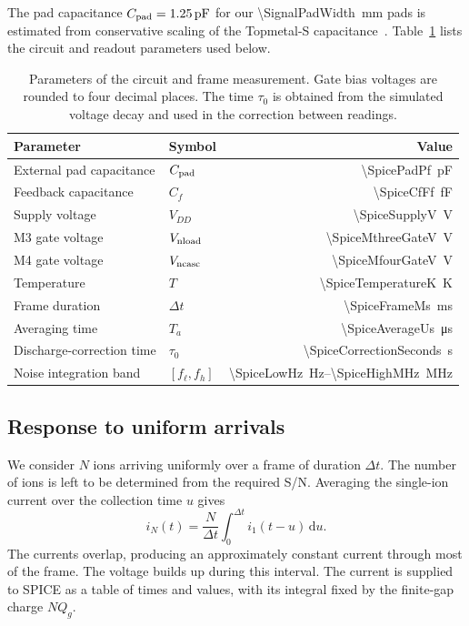 \documentclass[11pt,a4paper]{article}
\newcommand{\dd}{\mathrm{d}}
\begin{document}
The pad capacitance $C_{\rm pad}=\SI{1.25}{pF}$ for
our \SI{\SignalPadWidth}{mm} pads is estimated from conservative scaling
of the Topmetal-S capacitance~\cite{Gao2019TopmetalS}.
Table~\ref{tab:spice_parameters} lists the circuit and
readout parameters used below.

\begin{table}[!htbp]
 \centering
 \begin{tabular}{llr}
 \toprule
 Parameter & Symbol & Value \\
 \midrule
 External pad capacitance & $C_{\rm pad}$ & \SI{\SpicePadPf}{pF} \\
 Feedback capacitance & $C_f$ & \SI{\SpiceCfFf}{fF} \\
 Supply voltage & $V_{DD}$ & \SI{\SpiceSupplyV}{V} \\
 M3 gate voltage & $V_{\rm nload}$ & \SI{\SpiceMthreeGateV}{V} \\
 M4 gate voltage & $V_{\rm ncasc}$ & \SI{\SpiceMfourGateV}{V} \\
 Temperature & $T$ & \SI{\SpiceTemperatureK}{K} \\
 \midrule
 Frame duration & $\Delta t$ & \SI{\SpiceFrameMs}{ms} \\
 Averaging time & $T_a$ & \SI{\SpiceAverageUs}{\micro\second} \\
 Discharge-correction time & $\tau_0$ & \SI{\SpiceCorrectionSeconds}{s} \\
 Noise integration band & $[f_\ell,f_h]$ &
 \SI{\SpiceLowHz}{Hz}--\SI{\SpiceHighMHz}{MHz} \\
 \bottomrule
 \end{tabular}
 \caption{Parameters of the circuit and frame measurement. Gate bias voltages
 are rounded to four decimal places. The time $\tau_0$
 is obtained from the simulated voltage decay and used in the correction
 between readings.}
 \label{tab:spice_parameters}
\end{table}

\subsection{Response to uniform arrivals}
\label{sec:arrival_cases}

We consider $N$ ions arriving uniformly over a frame of duration $\Delta t$.
The number of ions is left to be determined from the required S/N.
Averaging the single-ion current over the collection time $u$ gives
\begin{equation}
 i_N(t)=\frac{N}{\Delta t}\int_0^{\Delta t}i_1(t-u)\,\dd u.
 \label{eq:uniform_arrival_current}
\end{equation}
The currents overlap, producing an approximately constant current through
most of the frame. The voltage builds up during this interval.
The current is supplied to SPICE as a table of times and values, with its
integral fixed by the finite-gap charge $NQ_g$.
\end{document}
